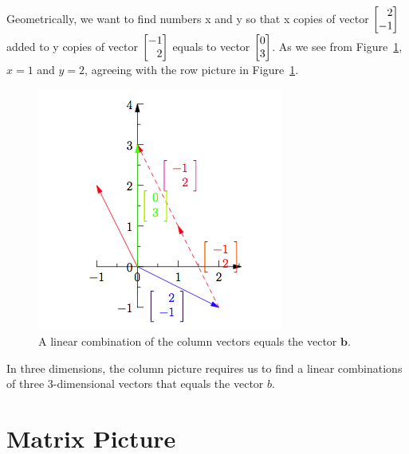 \documentclass{ximera}
\begin{document}
Geometrically, we want to find numbers x and y so that x copies of
vector $\begin{bmatrix}\phantom{-}2\\-1\end{bmatrix}$ added to y copies of vector
$\begin{bmatrix}-1\\\phantom{-}2\end{bmatrix}$ equals to vector
$\begin{bmatrix}0\\3\end{bmatrix}$. As we see from Figure~\ref{fig:rowpict}, $x =
1$ and $y = 2$, agreeing with the row picture in
Figure~\ref{fig:rowpict}.

\begin{figure}[H]\label{fig:rowpict}
\begin{image}
\includegraphics{Geometry2.png}
\end{image}
\caption{A linear combination of the column vectors equals the vector
  $\mathbf{b}$.}
\end{figure}

In three dimensions, the column picture requires us to find a linear
combinations of three 3-dimensional vectors that equals the vector $b$.

\section*{Matrix Picture}
\end{document}
